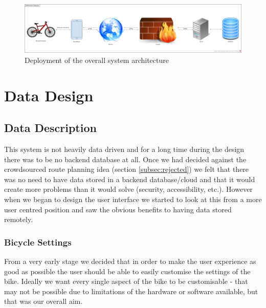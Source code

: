 \documentclass[a4paper]{report}
\begin{document}
{\begin{figure}[h]
\centering
\includegraphics[scale=0.2]{figures/system_architecture/overall_sys_arch}
\caption{Deployment of the overall system architecture}
\label{fig:overall_sys_arch}
\end{figure}

\chapter{Data Design}
\section{Data Description}
This system is not heavily data driven and for a long time during the design there was to be no backend database at all. Once we had decided against the crowdsourced route planning idea (section \ref{subsec:rejected}) we felt that there was no need to have data stored in a backend database/cloud and that it would create more problems than it would solve (security, accessibility, etc.). However when we began to design the user interface we started to look at this from a more user centred position and saw the obvious benefits to having data stored remotely.
\subsection{Bicycle Settings}
From a very early stage we decided that in order to make the user experience as good as possible the user should be able to easily customise the settings of the bike. Ideally we want every single aspect of the bike to be customisable - that may not be possible due to limitations of the hardware or software available, but that was our overall aim. 

}
\end{document}
